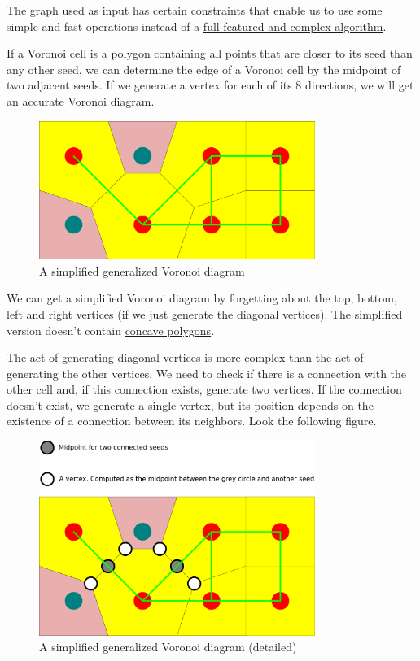 The graph used as input has certain constraints that enable us to use some
simple and fast operations instead of a
\href{http://en.wikipedia.org/wiki/Fortune\%27s_algorithm}{full-featured and
complex algorithm}.

If a Voronoi cell is a polygon containing all points that are closer to its seed
than any other seed, we can determine the edge of a Voronoi cell by the midpoint
of two adjacent seeds. If we generate a vertex for each of its 8 directions, we
will get an accurate Voronoi diagram.

\begin{figure}[H]
  \centering
  \includegraphics[width=0.8\textwidth]{assets/voronoi.pdf}
  \caption{A simplified generalized Voronoi diagram}
\end{figure}

We can get a simplified Voronoi diagram by forgetting about the top, bottom,
left and right vertices (if we just generate the diagonal vertices). The
simplified version doesn't contain
\href{http://en.wikipedia.org/wiki/Concave_polygon}{concave polygons}.

The act of generating diagonal vertices is more complex than the act of
generating the other vertices. We need to check if there is a connection with
the other cell and, if this connection exists, generate two vertices. If the
connection doesn't exist, we generate a single vertex, but its position depends
on the existence of a connection between its neighbors. Look the following
figure.

\begin{figure}[H]
  \centering
  \includegraphics[width=0.8\textwidth]{assets/voronoi2.pdf}
  \caption{A simplified generalized Voronoi diagram (detailed)}
\end{figure}

